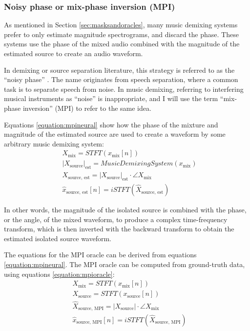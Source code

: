 \documentclass[report.tex]{subfiles}
\begin{document}
\subsubsection{Noisy phase or mix-phase inversion (MPI)}
\label{sec:noisyphaseoracle}


As mentioned in Section \ref{sec:masksandoracles}, many music demixing systems prefer to only estimate magnitude spectrograms, and discard the phase. These systems use the phase of the mixed audio combined with the magnitude of the estimated source to create an audio waveform.

In demixing or source separation literature, this strategy is referred to as the ``noisy phase'' \parencite{noisyphase1, noisyphase2}. The name originates from speech separation, where a common task is to separate speech from noise. In music demixing, referring to interfering musical instruments as ``noise'' is inappropriate, and I will use the term ``mix-phase inversion'' (MPI) to refer to the same idea.

Equations \eqref{equation:mpineural} show how the phase of the mixture and magnitude of the estimated source are used to create a waveform by some arbitrary music demixing system:
\begin{align}\tag{29}\label{equation:mpineural}
	\nonumber & X_{\text{mix}} = \mathit{STFT}(x_{\text{mix}}[n])\\
	\nonumber & {|X_{\text{source}}|}_{\text{est}} = \mathit{MusicDemixingSystem}(x_{\text{mix}})\\
	\nonumber & X_{\text{source, est}} = {|X_{\text{source}}|}_{\text{est}} \cdot \angle{X_{\text{mix}}}\\
	\nonumber & \hat{x}_{\text{source, est}}[n] = \mathit{iSTFT}(\hat{X}_{\text{source, est}})
\end{align}

In other words, the magnitude of the isolated source is combined with the phase, or the angle, of the mixed waveform, to produce a complex time-frequency transform, which is then inverted with the backward transform to obtain the estimated isolated source waveform. 

The equations for the MPI oracle can be derived from equations \eqref{equation:mpineural}. The MPI oracle can be computed from ground-truth data, using equations \eqref{equation:mpioracle}:
\begin{align}\tag{30}\label{equation:mpioracle}
	\nonumber & X_{\text{mix}} = \mathit{STFT}(x_{\text{mix}}[n])\\
	\nonumber & X_{\text{source}} = \mathit{STFT}(x_{\text{source}}[n])\\
	\nonumber & \hat{X}_{\text{source, MPI}} = |X_{\text{source}}| \cdot \angle{X_{\text{mix}}}\\
	\nonumber & \hat{x}_{\text{source, MPI}}[n] = \mathit{iSTFT}(\hat{X}_{\text{source, MPI}})
\end{align}
\end{document}
